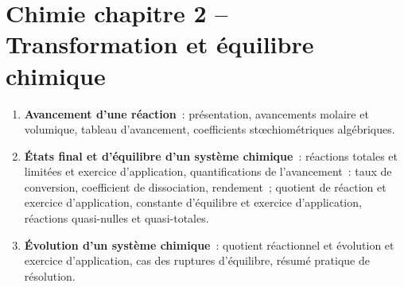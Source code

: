 \documentclass[a4paper, 12pt, final, garamond]{book}
\begin{document}
\section*{Chimie chapitre 2 -- Transformation et équilibre chimique}
\begin{enumerate}[label=\Roman*]
    \item \textbf{Avancement d'une réaction}~: présentation, avancements molaire
        et volumique, tableau d'avancement, coefficients stœchiométriques
        algébriques.
    \item \textbf{États final et d'équilibre d'un système chimique}~: réactions
        totales et limitées et exercice d'application, quantifications de
        l'avancement~: taux de conversion, coefficient de dissociation,
        rendement~; quotient de réaction et exercice d'application, constante
        d'équilibre et exercice d'application, réactions quasi-nulles et
        quasi-totales.
    \item \textbf{Évolution d'un système chimique}~: quotient réactionnel et
        évolution et exercice d'application, cas des ruptures d'équilibre,
        résumé pratique de résolution.
\end{enumerate}
\end{document}
